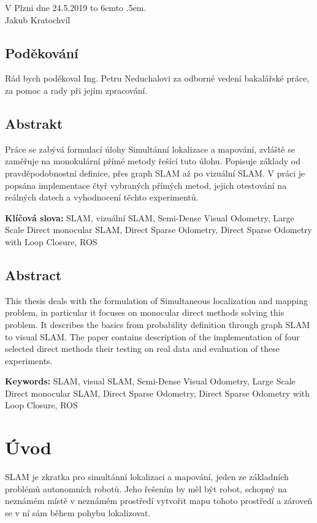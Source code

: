 \documentclass[12pt,a4paper]{article}
\def\dotfill#1{\cleaders\hbox to #1{.}\hfill}
\newcommand\dotline[2][.5em]{\leavevmode\hbox to #2{\dotfill{#1}\hfil}}
\begin{document}
\vspace{2cm}
\noindent
V Plzni dne 24.5.2019 \hfill \dotline{6cm} \\

\hspace*{10.7cm} Jakub Kratochvíl

\vspace{6cm}

\subsection*{Poděkování}

Rád bych poděkoval Ing. Petru Neduchalovi za odborné vedení bakalářské práce, za pomoc a rady při jejím zpracování.

\newpage
\subsection*{Abstrakt}
Práce se zabývá formulací úlohy Simultánní lokalizace a mapování, zvláště se zaměřuje na monokulární přímé metody řešící tuto úlohu. Popisuje základy od pravděpodobnostní definice, přes graph SLAM až po vizuální SLAM. V práci je popsána implementace čtyř vybraných přímých metod, jejich otestování na reálných datech a vyhodnocení těchto experimentů. 

\noindent
\textbf{Klíčová slova:} SLAM, vizuální SLAM, Semi-Dense Visual Odometry, Large Scale Direct monocular SLAM, Direct Sparse Odometry, Direct Sparse Odometry with Loop Closure, ROS

\subsection*{Abstract}
This thesis deals with the formulation of Simultaneous localization and mapping problem, in particular it focuses on monocular direct methods solving this problem. It describes the basics from probability definition through graph SLAM to visual SLAM. The paper contains description of the implementation of four selected direct methods their testing on real data and evaluation of these experiments.

\noindent
\textbf{Keywords:} SLAM, visual SLAM, Semi-Dense Visual Odometry, Large Scale Direct monocular SLAM, Direct Sparse Odometry, Direct Sparse Odometry with Loop Closure, ROS

\newpage
\tableofcontents
\newpage
\fontsize{12pt}{18pt}\selectfont


\section{Úvod}
SLAM je zkratka pro simultánní lokalizaci a mapování, jeden ze základních problémů autonomních robotů. Jeho řešením by měl být robot, schopný na neznámém místě v neznámém prostředí vytvořit mapu tohoto prostředí a zároveň se v ní sám během pohybu lokalizovat.
\end{document}
